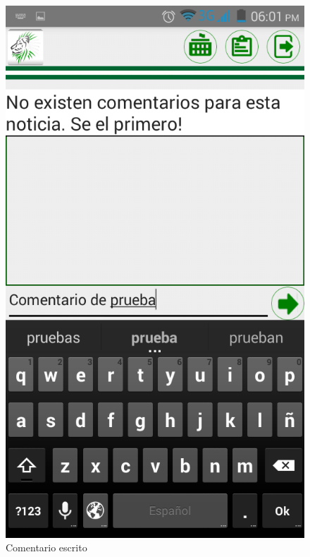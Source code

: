 \begin{figure}
\centering
\includegraphics[scale=0.5]{./android/imagenes/com2.png}
\caption{Comentario escrito}
\label{com2}
\end{figure}

